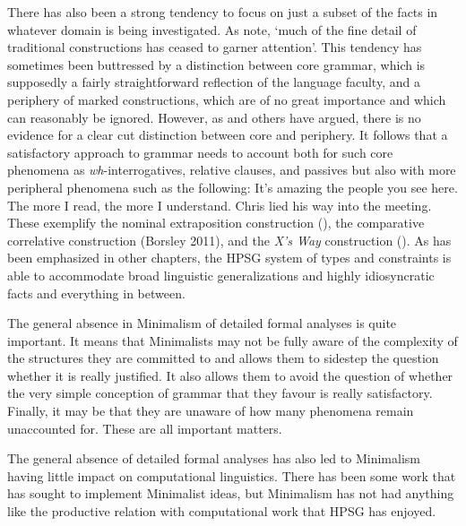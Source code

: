 \documentclass[output=paper]{langsci/langscibook}
\begin{document}
There has also been a strong tendency to focus on just a subset of the facts in whatever domain is being investigated. As \citet[535]{CJ2005a} note, `much of the fine detail of traditional constructions has ceased to garner attention'. This tendency has sometimes been buttressed by a distinction between core grammar, which is supposedly a fairly straightforward reflection of the language faculty, and a periphery of marked constructions, which are of no great importance and which can reasonably be ignored. However, as \citet{Culicover99a-u} and others have argued, there is no evidence for a clear cut distinction between core and periphery. It follows that a satisfactory approach to grammar needs to account both for such core phenomena as \textit{wh}-interrogatives, relative clauses, and passives but also with more peripheral phenomena such as the following:
\eal
\ex It's amazing the people you see here.\label{ex:min-amazing-people}
\ex The more I read, the more I understand.\label{ex:min-read-understand}
\ex Chris lied his way into the meeting.\label{ex:min-chris-meeting}
\zl 
These exemplify the nominal extraposition construction (\citealt{ML96a}), the comparative correlative construction (Borsley 2011), and the \textit{X's Way} construction (\citealt{Sag2012a}). As has been emphasized in other chapters, the HPSG system of types and constraints is able to accommodate broad linguistic generalizations and highly idiosyncratic facts and everything in between.

The general absence in Minimalism of detailed formal analyses is quite important. It means that Minimalists may not be fully aware of the complexity of the structures they are committed to and allows them to sidestep the question whether it is really justified. It also allows them to avoid the question of whether the very simple conception of grammar that they favour is really satisfactory. Finally, it may be that they are unaware of how many phenomena remain unaccounted for. These are all important matters. 

The general absence of detailed formal analyses has also led to Minimalism having little impact on computational linguistics. There has been some work that has sought to implement Minimalist ideas, but Minimalism has not had anything like the productive relation with computational work that HPSG has enjoyed.
\end{document}
